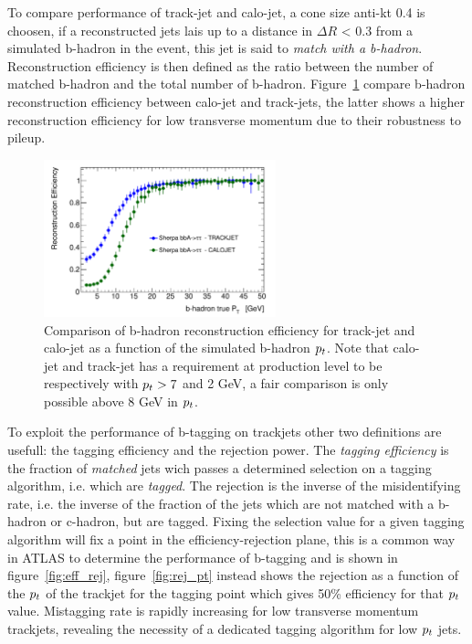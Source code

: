 To compare performance of track-jet and calo-jet, a cone size anti-kt 0.4 is choosen,
if a reconstructed jets lais up to a distance in $\Delta R $ < 0.3 from a simulated b-hadron
in the event, this jet is said to \emph{match with a b-hadron}. 
Reconstruction efficiency is then defined as the ratio between the number of matched b-hadron
and the total number of b-hadron. Figure~\ref{fig:recoEff} compare b-hadron reconstruction efficiency
between calo-jet and track-jets, the latter shows a higher reconstruction efficiency for low 
transverse momentum due to their robustness to pileup.
\begin{figure}[tp]
\centering
\includegraphics[width=0.6\textwidth]{figure/trackjet/recoEfficiency.pdf}
\caption{Comparison of b-hadron reconstruction efficiency for track-jet and calo-jet as a 
function of the simulated b-hadron $p_{t}$. Note that calo-jet and track-jet has a requirement 
at production level to be respectively with $p_{t} > 7$ and 2 GeV, a fair comparison is only possible
above 8 GeV in $p_{t}$.}
\label{fig:recoEff}
\end{figure}    

To exploit the performance of b-tagging on trackjets other two definitions are usefull: the tagging
efficiency and the rejection power. The \emph{tagging efficiency} is the fraction of \emph{matched} jets 
wich passes a determined selection on a tagging algorithm, i.e. which are \emph{tagged}.
The rejection is the inverse of the misidentifying rate, i.e. the inverse of the fraction 
of the jets which are not matched with a b-hadron or c-hadron, but are tagged. Fixing the selection
value for a given tagging algorithm will fix a point in the efficiency-rejection plane, this
is a common way in ATLAS to determine the performance of b-tagging and is shown in figure~\ref{fig:eff_rej},
figure~\ref{fig:rej_pt} instead shows the rejection as a function of the $p_{t}$ of the trackjet for the
tagging point which gives 50\% efficiency for that $p_{t}$ value. Mistagging rate is rapidly increasing
for low transverse momentum trackjets, revealing the necessity of a dedicated tagging algorithm for 
low $p_{t}$ jets.

